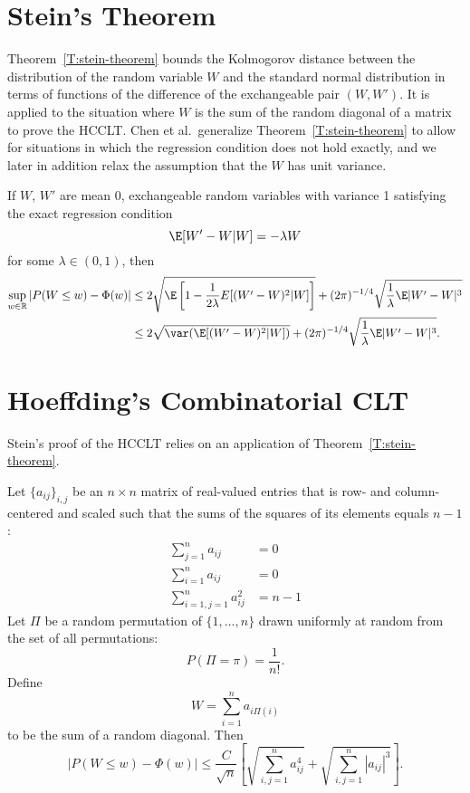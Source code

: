 \section{Stein's Theorem}
Theorem~\ref{T:stein-theorem} bounds the Kolmogorov distance between the
distribution of the random variable $W$ and the standard normal distribution
in terms of functions of the difference of the exchangeable pair $(W, W')$.  It is
applied to the situation where $W$ is the sum of the random diagonal of a matrix
to prove the HCCLT.  Chen et al.\ generalize Theorem~\ref{T:stein-theorem} to allow
for situations in which the regression condition does not hold exactly, and
we later in addition relax the assumption that the $W$ has unit variance.
\begin{theorem}[Stein]\label{T:stein-theorem}
  If $W$, $W'$ are mean 0, exchangeable random variables with variance 1
  satisfying the exact regression condition
  \begin{equation*}
    \E[W'-W|W] = -\lambda W
  \end{equation*}
  for some $\lambda \in (0,1)$, then
  \begin{align*}
    \sup_{w \in \mathbb{R}} |P(W \leq w) - \Phi(w)| &\leq
    2\sqrt{\E \left [1 - \frac{1}{2 \lambda}E[(W'-W)^2|W] \right ]} +
    (2 \pi)^{-1/4}\sqrt{\frac{1}{\lambda}\E |W'-W|^3} \\
    &\leq 2 \sqrt{\var (\E [(W'-W)^2|W])} +
    (2 \pi)^{-1/4}\sqrt{\frac{1}{\lambda}\E |W'-W|^3}.
  \end{align*}
\end{theorem}

\section{Hoeffding's Combinatorial CLT}
Stein's proof of the HCCLT relies on an application of Theorem~\ref{T:stein-theorem}.
\begin{theorem}\label{T:HCCLT}
  Let $\{a_{ij}\}_{i,j}$ be an $n \times n$ matrix of real-valued
  entries that is row- and column-centered and scaled such that the sums
  of the squares of its elements equals $n-1$:
  \begin{align*}
    \sum_{j=1}^n a_{ij} &= 0 \\
    \sum_{i=1}^n a_{ij} &= 0 \\
    \sum_{i=1, j=1}^n a_{ij}^2 &= n-1
  \end{align*}
  Let $\Pi$ be a random permutation of $\{1, \ldots, n\}$ drawn
  uniformly at random from the set of all permutations:
  \begin{equation*}
    P(\Pi = \pi) = \frac{1}{n!}.
  \end{equation*}
  Define
  \begin{equation*}
    W = \sum_{i=1}^n a_{i\Pi(i)}
  \end{equation*}
  to be the sum of a random diagonal.  Then
  \begin{equation*}
    |P(W \leq w) - \Phi(w)| \leq
    \frac{C}{\sqrt{n}} \left [
      \sqrt{\sum_{i, j = 1}^{n} a_{ij}^4} +
      \sqrt{\sum_{i, j = 1}^{n} |a_{ij}|^3}
    \right ].
  \end{equation*}
\end{theorem}

